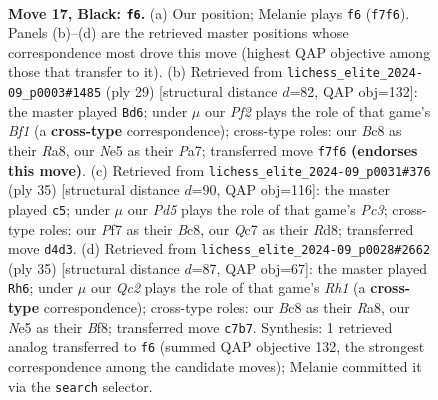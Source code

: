 \documentclass[11pt]{article}
\begin{document}
\clearpage

\begin{figure}[p]\centering
\begin{subfigure}{0.46\textwidth}\centering
\resizebox{\linewidth}{!}{%
\newchessgame
\chessboard[
  setfen={r1b1kb1r/2q2ppp/1p6/p3n3/3p3P/1Q3N2/PP3PP1/RNB1R1K1 b q - 1 17},
  showmover=false,
  pgfstyle=straightmove, color=movearrow, markmove={f7-f6}
]}
\caption{}
\end{subfigure}\hfill
\begin{subfigure}{0.46\textwidth}\centering
\resizebox{\linewidth}{!}{%
\newchessgame
\chessboard[
  setfen={r3kb1r/ppqn1pp1/4p2p/2p1N3/Q1PP1B2/8/PP3PPP/R3K2R b KQkq - 6 15},
  showmover=false,
  pgfstyle=straightmove, color=movearrow, markmove={f8-d6}
]}
\caption{}
\end{subfigure}
\\[4pt]
\begin{subfigure}{0.46\textwidth}\centering
\resizebox{\linewidth}{!}{%
\newchessgame
\chessboard[
  setfen={r1br2k1/p1q1ppb1/2p3p1/4N2p/2Pn1P2/1PN5/PB3QPP/3RR1K1 b - - 6 18},
  showmover=false,
  pgfstyle=straightmove, color=movearrow, markmove={c6-c5}
]}
\caption{}
\end{subfigure}\hfill
\begin{subfigure}{0.46\textwidth}\centering
\resizebox{\linewidth}{!}{%
\newchessgame
\chessboard[
  setfen={r4b1r/pppq1kp1/3pNn2/3P2Qp/2B2R2/7P/PPP3P1/R5K1 b - - 1 18},
  showmover=false,
  pgfstyle=straightmove, color=movearrow, markmove={h8-h6}
]}
\caption{}
\end{subfigure}
\caption{\textbf{Move 17, Black: \texttt{f6}.} (a) Our position; Melanie plays \texttt{f6} (\texttt{f7f6}). Panels (b)--(d) are the retrieved master positions whose correspondence most drove this move (highest QAP objective among those that transfer to it). (b) Retrieved from \texttt{lichess\_elite\_2024-09\_p0003\#1485} (ply 29) [structural distance $d$=82, QAP obj=132]: the master played \texttt{Bd6}; under $\mu$ our \emph{Pf2} plays the role of that game's \emph{Bf1} (a \textbf{cross-type} correspondence); cross-type roles: our \emph{B}c8 as their \emph{R}a8, our \emph{N}e5 as their \emph{P}a7; transferred move \texttt{f7f6} \textbf{(endorses this move)}. (c) Retrieved from \texttt{lichess\_elite\_2024-09\_p0031\#376} (ply 35) [structural distance $d$=90, QAP obj=116]: the master played \texttt{c5}; under $\mu$ our \emph{Pd5} plays the role of that game's \emph{Pc3}; cross-type roles: our \emph{P}f7 as their \emph{B}c8, our \emph{Q}c7 as their \emph{R}d8; transferred move \texttt{d4d3}. (d) Retrieved from \texttt{lichess\_elite\_2024-09\_p0028\#2662} (ply 35) [structural distance $d$=87, QAP obj=67]: the master played \texttt{Rh6}; under $\mu$ our \emph{Qc2} plays the role of that game's \emph{Rh1} (a \textbf{cross-type} correspondence); cross-type roles: our \emph{B}c8 as their \emph{R}a8, our \emph{N}e5 as their \emph{B}f8; transferred move \texttt{c7b7}. Synthesis: 1 retrieved analog transferred to \texttt{f6} (summed QAP objective 132, the strongest correspondence among the candidate moves); Melanie committed it via the \texttt{search} selector.}
\label{fig:thought-m33}
\end{figure}
\end{document}
